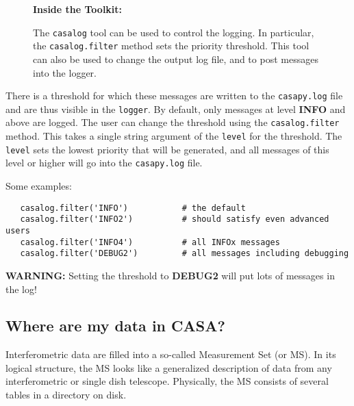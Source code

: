 \begin{wrapfigure}{r}{2.5in}
  \begin{boxedminipage}{2.5in}
     \centerline{\bf Inside the Toolkit:}
     The {\tt casalog} tool can be used to control the logging.
     In particular, the {\tt casalog.filter} method sets the
     priority threshold.  This tool can also be used to change
     the output log file, and to post messages into the logger.
  \end{boxedminipage}
\end{wrapfigure}

There is a threshold for which these messages are
written to the {\tt casapy.log} file and are thus visible in the
{\tt logger}.  By default, only messages at level {\bf INFO} and
above are logged.  The user can change the threshold using the
{\tt casalog.filter} method.  This takes a single string argument of
the {\tt level} for the threshold.  The {\tt level} sets the lowest
priority that will be generated, and all messages of this level or
higher will go into the {\tt casapy.log} file.

Some examples:
\small
\begin{verbatim}
   casalog.filter('INFO')           # the default
   casalog.filter('INFO2')          # should satisfy even advanced users
   casalog.filter('INFO4')          # all INFOx messages
   casalog.filter('DEBUG2')         # all messages including debugging
\end{verbatim}
\normalsize

{\bf WARNING:} Setting the threshold to {\bf DEBUG2} will put lots of
messages in the log!


\subsection{Where are my data in CASA?}
\label{section:intro.common.data}

Interferometric data are filled into a so-called Measurement Set (or
MS).  In its logical structure, the MS looks like a generalized
description of data from any interferometric
or single dish telescope. Physically, the MS consists of several
tables in a directory on disk.  

